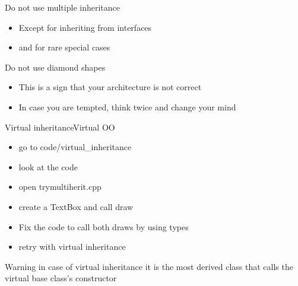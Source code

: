 \begin{frame}[fragile]
  \begin{block}{Do not use multiple inheritance}
    \begin{itemize}
    \item Except for inheriting from interfaces
    \item and for rare special cases
    \end{itemize}
  \end{block}
  \pause
  \begin{alertblock}{Do not use diamond shapes}
    \begin{itemize}
    \item This is a sign that your architecture is not correct
    \item In case you are tempted, think twice and change your mind
    \end{itemize}
  \end{alertblock}
\end{frame}

\begin{frame}[fragile]
  \begin{exerciseWithShortcut}{Virtual inheritance}{Virtual OO}
    \begin{itemize}
    \item go to code/virtual\_inheritance
    \item look at the code
    \item open trymultiherit.cpp
    \item create a TextBox and call draw
    \item Fix the code to call both draws by using types
    \item retry with virtual inheritance
    \end{itemize}
  \end{exerciseWithShortcut}
\end{frame}

\begin{frame}[fragile]
  \begin{alertblock}{Warning}
    in case of virtual inheritance it is the most derived class that calls the virtual base class's constructor
  \end{alertblock}
\end{frame}
